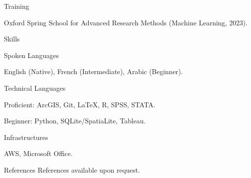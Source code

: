 \documentclass[10pt]{resume} %
\begin{document}
	\begin{rSection}{Training} \itemsep -5pt
		\item Oxford Spring School for Advanced Research Methods (Machine Learning, 2023).
	\end{rSection}

	\begin{rSection}{Skills} \itemsep -5pt
		\begin{rSubsection}{Spoken Languages}{}{}
			\item English (Native), French (Intermediate), Arabic (Beginner).
		\end{rSubsection}
		\begin{rSubsection}{Technical Languages}{}{}
			\item Proficient: ArcGIS, Git, \LaTeX, R, SPSS, STATA.
			\item Beginner: Python, SQLite/SpatiaLite, Tableau.
		\end{rSubsection}
		\begin{rSubsection}{Infrastructures}{}{}
			\item AWS, Microsoft Office.
		\end{rSubsection}
	\end{rSection}
	
	\begin{rSection}{References}
		References available upon request. 
	\end{rSection}
	
\end{document}
